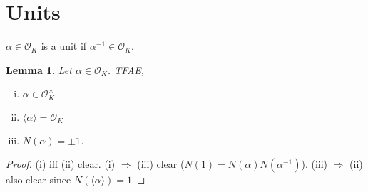 \documentclass{article}
\theoremstyle{definition}
\theoremstyle{remark}
\theoremstyle{plain}
\newtheorem{lem}[defn]{Lemma}
\begin{document}
\section{Units}
$\alpha\in\mathcal O_K$ is a unit if  $\alpha^{-1}\in\mathcal O_K$.
\begin{lem}
    Let $\alpha\in\mathcal O_K$. TFAE,
    \begin{enumerate}[(i)]
        \item $\alpha\in\mathcal O_K^\times$
        \item $\langle\alpha\rangle=\mathcal O_K$
        \item $N(\alpha)=\pm1$.
    \end{enumerate}
\end{lem}
\begin{proof}
    (i) iff (ii) clear. (i) $\Rightarrow$ (iii) clear ($N(1)=N(\alpha)N(\alpha^{-1})$). (iii) $\Rightarrow$ (ii) also clear since $N(\langle\alpha\rangle)=1$
\end{proof}
\end{document}
